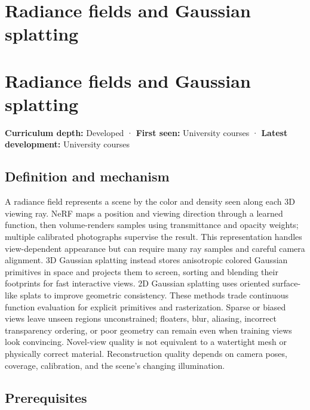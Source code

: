 \hypertarget{appendix-c5b332e400e7}{}
\section*{Radiance fields and Gaussian splatting}
\section{Radiance fields and Gaussian splatting}\label{radiance-fields-and-gaussian-splatting}

\textbf{Curriculum depth:} Developed · \textbf{First seen:} University courses · \textbf{Latest development:} University courses

\subsection{Definition and mechanism}\label{definition-and-mechanism}

A radiance field represents a scene by the color and density seen along each 3D viewing ray. NeRF maps a position and viewing direction through a learned function, then volume-renders samples using transmittance and opacity weights; multiple calibrated photographs supervise the result. This representation handles view-dependent appearance but can require many ray samples and careful camera alignment. 3D Gaussian splatting instead stores anisotropic colored Gaussian primitives in space and projects them to screen, sorting and blending their footprints for fast interactive views. 2D Gaussian splatting uses oriented surface-like splats to improve geometric consistency. These methods trade continuous function evaluation for explicit primitives and rasterization. Sparse or biased views leave unseen regions unconstrained; floaters, blur, aliasing, incorrect transparency ordering, or poor geometry can remain even when training views look convincing. Novel-view quality is not equivalent to a watertight mesh or physically correct material. Reconstruction quality depends on camera poses, coverage, calibration, and the scene's changing illumination.

\subsection{Prerequisites}\label{prerequisites}


